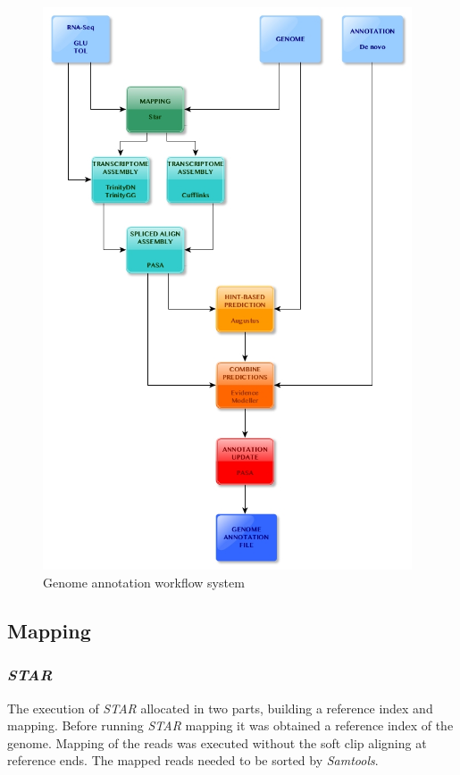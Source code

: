 \documentclass[12pt, a4paper]{report}
\begin{document}
\begin{figure}[H]
	\centering	
	\includegraphics[width=310pt]{pics/pipeline}
	\caption[Genome Annotation Workflow]
	{Genome annotation workflow system}
	\label{fig:pipeline}
\end{figure}

\subsection*{Mapping}
\subsubsection*{\textit{STAR}}
The execution of \textit{STAR} allocated in two parts, building a reference index and mapping. Before running \textit{STAR} mapping it was obtained a reference index of the genome. Mapping of the reads was executed without the soft clip aligning at reference ends. The mapped reads needed to be sorted by \textit{Samtools}.
\end{document}

